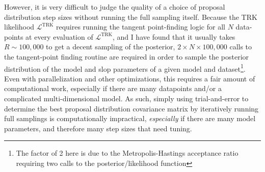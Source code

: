 However, it is very difficult to judge the quality of a choice of proposal distribution step sizes without running the full sampling itself. Because the TRK likelihood $\mathcal{L}^\text{TRK}$ requires running the tangent point-finding logic for all $N$ data-points at every evaluation of $\mathcal{L}^\text{TRK}$, and I have found that it usually takes $R\sim 100,000$ to get a decent sampling of the posterior, $2\times N\times 100,000$ calls to the tangent-point finding routine are required in order to sample the posterior distribution of the model and slop parameters of a given model and dataset\footnote{The factor of 2 here is due to the Metropolis-Hastings acceptance ratio requiring two calls to the posterior/likelihood function}. Even with parallelization and other optimizations, this requires a fair amount of computational work, especially if there are many datapoints and/or a complicated multi-dimensional model. As such, simply using trial-and-error to determine the best proposal distribution covariance matrix by iteratively running full samplings is computationally impractical, \textit{especially} if there are many model parameters, and therefore many step sizes that need tuning.

